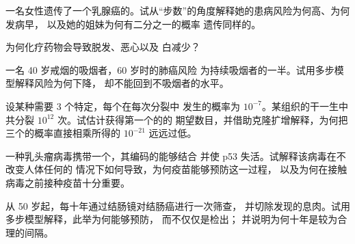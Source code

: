 \begin{exercise}[$\star\star$]\label{exo:g11:cancer:9}
一名女性遗传了一个乳腺癌的。试从“步数”的角度解释她的患病风险为何高、为何发病早，
以及她的姐妹为何有二分之一的概率
遗传同样的。
\end{exercise}

\begin{exercise}[$\star\star$]\label{exo:g11:cancer:10}
为何化疗药物会导致脱发、恶心以及
白减少？
\end{exercise}

\begin{exercise}[$\star\star$]\label{exo:g11:cancer:11}
一名 40 岁戒烟的吸烟者，60 岁时的肺癌风险
为持续吸烟者的一半。试用多步模型解释风险为何下降，
却不能回到不吸烟者的水平。
\end{exercise}

\begin{exercise}[$\star\star\star$]\label{exo:g11:cancer:12}
设某种需要 3 个特定，每个在每次分裂中
发生的概率为 $10^{-7}$。某组织的干一生中
共分裂 $10^{12}$ 次。试估计获得第一个的的
期望数目，并借助克隆扩增解释，为何把三个的概率直接相乘所得的
$10^{-21}$ 远远过低。
\end{exercise}

\begin{exercise}[$\star\star\star$]\label{exo:g11:cancer:13}
一种乳头瘤病毒携带一个，其编码的能够结合
并使 p53 失活。试解释该病毒在不改变人体任何的
情况下如何导致，为何疫苗能够预防这一过程，
以及为何在接触病毒之前接种疫苗十分重要。
\end{exercise}

\begin{exercise}[$\star\star\star$]\label{exo:g11:cancer:14}
从 50 岁起，每十年通过结肠镜对结肠癌进行一次筛查，
并切除发现的息肉。试用多步模型解释，此举为何能够预防，
而不仅仅是检出；
并说明为何十年是较为合理的间隔。
\end{exercise}

